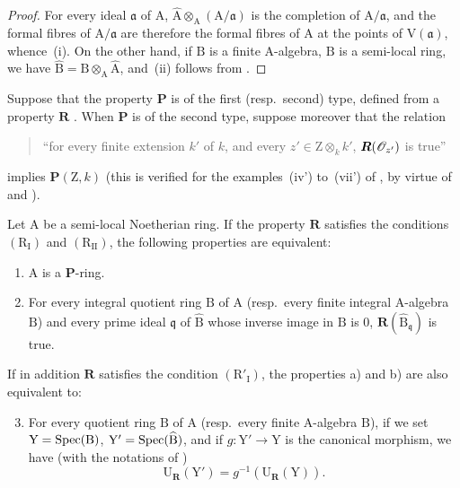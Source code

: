 \begin{proof}
For every ideal $\mathfrak{a}$ of $\mathrm{A}$, $\widehat{\mathrm{A}}\otimes_\mathrm{A}(\mathrm{A}/\mathfrak{a})$ is the completion of $\mathrm{A}/\mathfrak{a}$, and the formal fibres of $\mathrm{A}/\mathfrak{a}$ are therefore the formal fibres of $\mathrm{A}$ at the points of $\mathrm{V}(\mathfrak{a})$, whence~(i).
On the other hand, if $\mathrm{B}$ is a finite $\mathrm{A}$-algebra, $\mathrm{B}$ is a semi-local ring, we have $\widehat{\mathrm{B}}=\mathrm{B}\otimes_\mathrm{A}\widehat{\mathrm{A}}$, and~(ii) follows from .
\end{proof}

\begin{proposition}[7.3.16]
\label{IV.7.3.16}
Suppose that the property $\boldsymbol{P}$ is of the first \textup{(resp.}~second) type, defined from a property $\boldsymbol{R}$ .
When $\boldsymbol{P}$ is of the second type, suppose moreover that the relation
\begin{quote}
``for every \textup{finite} extension $k'$ of $k$, and every $z'\in\mathrm{Z}\otimes_k k'$, $\boldsymbol{R}(\mathscr{O}_{z'})$ is true''
\end{quote}
implies $\boldsymbol{P}(\mathrm{Z},k)$ \textup{(this is verified for the examples~(iv') to~(vii') of , by virtue of  and )}.

Let $\mathrm{A}$ be a semi-local Noetherian ring.
If the property $\boldsymbol{R}$ satisfies the conditions $(\mathrm{R_I})$ and $(\mathrm{R_{II}})$, the following properties are equivalent:
\begin{enumerate}[label=\emph{\alph*)}]
  \item $\mathrm{A}$ is a $\boldsymbol{P}$-ring.
  \item For every integral quotient ring $\mathrm{B}$ of $\mathrm{A}$ \textup{(resp.}~every finite integral A-algebra $\mathrm{B}$) and every prime ideal $\mathfrak{q}$ of $\widehat{\mathrm{B}}$ whose inverse image in $\mathrm{B}$ is $0$, $\boldsymbol{R}(\widehat{\mathrm{B}}_\mathfrak{q})$ is true.
\end{enumerate}
If in addition $\boldsymbol{R}$ satisfies the condition $(\mathrm{R}'_\mathrm{I})$, the properties \textup{a)} and \textup{b)} are also equivalent to:
\begin{enumerate}[label=\emph{\alph*)}]
  \setcounter{enumi}{2}
  \item For every quotient ring $\mathrm{B}$ of $\mathrm{A}$ \textup{(resp.}~every finite A-algebra $\mathrm{B}$), if we set $\mathrm{Y}=\operatorname{Spec}(\mathrm{B})$, $\mathrm{Y}'=\operatorname{Spec}(\widehat{\mathrm{B}})$, and if $g:\mathrm{Y}'\to\mathrm{Y}$ is the canonical morphism, we have (with the notations of )
  \[
    \mathrm{U}_{\mathbf{R}}(\mathrm{Y}')=g^{-1}(\mathrm{U}_{\mathbf{R}}(\mathrm{Y})).
    \label{IV.7.3.16.1}
\tag{7.3.16.1}
  \]
\end{enumerate}
\end{proposition}

